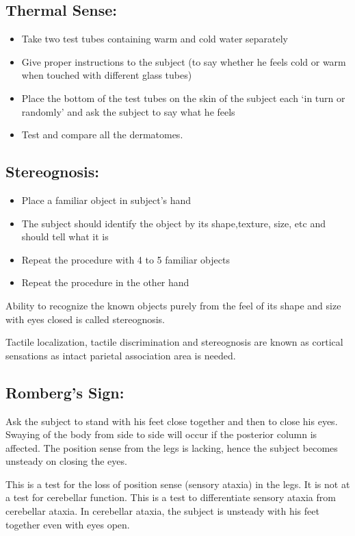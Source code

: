 \documentclass[a4paper,12pt,openany,twoside]{book}
\begin{document}
	\subsection*{Thermal Sense:}
	\begin{itemize}
			\itemsep0em
\item{Take two test tubes containing warm and cold water separately}
\item{Give proper instructions to the subject (to say whether he feels cold or warm when touched with different glass tubes)}
\item{Place the bottom of the test tubes on the skin of the subject each ‘in turn or randomly’ and ask the subject to say what he feels}
\item{Test and compare all the dermatomes.}
	\end{itemize}
	\subsection*{Stereognosis:}
\begin{itemize}
		\itemsep0em
\item{Place a familiar object in subject’s hand}
\item{The subject should identify the object by its shape,texture, size, etc and should tell what it is}
\item{Repeat the procedure with 4 to 5 familiar objects}
\item{Repeat the procedure in the other hand}
	\end{itemize}
	\par
	Ability to recognize the known objects purely from the feel of its shape and size with eyes closed is called stereognosis.
	\par
	Tactile localization, tactile discrimination and stereognosis are known as cortical sensations as intact parietal association area is needed.
\subsection*{Romberg’s Sign:}
\par
	Ask the subject to stand with his feet close together and then to close his eyes. Swaying of the body from side to side will occur if the posterior column is affected. The position sense from the legs is lacking, hence the subject becomes unsteady on closing the eyes.
	\par
	This is a test for the loss of position sense (sensory ataxia) in the legs. It is not at a test for cerebellar function. This is a test to differentiate sensory ataxia from cerebellar ataxia. In cerebellar ataxia, the subject is unsteady with his feet together even with eyes open.
\end{document}
